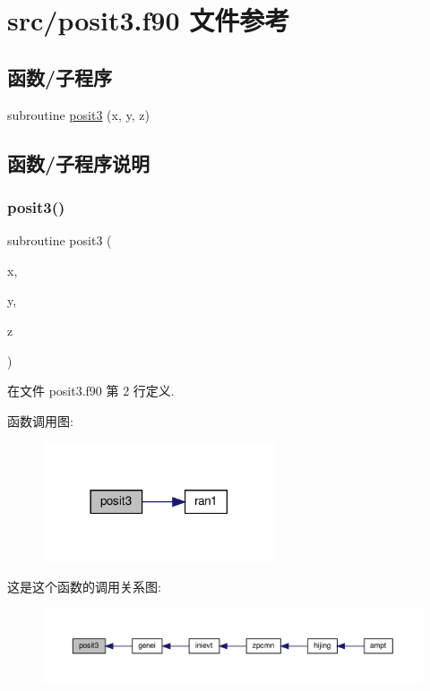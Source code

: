 \hypertarget{posit3_8f90}{}\section{src/posit3.f90 文件参考}
\label{posit3_8f90}
\subsection*{函数/子程序}
\begin{DoxyCompactItemize}
\item 
subroutine \mbox{\hyperlink{posit3_8f90_a0fc0d58ce73d7ca047c5118eaa3dfec6}{posit3}} (x, y, z)
\end{DoxyCompactItemize}


\subsection{函数/子程序说明}
\mbox{\label{posit3_8f90_a0fc0d58ce73d7ca047c5118eaa3dfec6}} 
\subsubsection{\texorpdfstring{posit3()}{posit3()}}
{\footnotesize\ttfamily subroutine posit3 (\begin{DoxyParamCaption}\item[{}]{x,  }\item[{}]{y,  }\item[{}]{z }\end{DoxyParamCaption})}



在文件 posit3.\+f90 第 2 行定义.

函数调用图\+:
\nopagebreak
\begin{figure}[H]
\begin{center}
\leavevmode
\includegraphics[width=194pt]{posit3_8f90_a0fc0d58ce73d7ca047c5118eaa3dfec6_cgraph}
\end{center}
\end{figure}
这是这个函数的调用关系图\+:
\nopagebreak
\begin{figure}[H]
\begin{center}
\leavevmode
\includegraphics[width=350pt]{posit3_8f90_a0fc0d58ce73d7ca047c5118eaa3dfec6_icgraph}
\end{center}
\end{figure}
